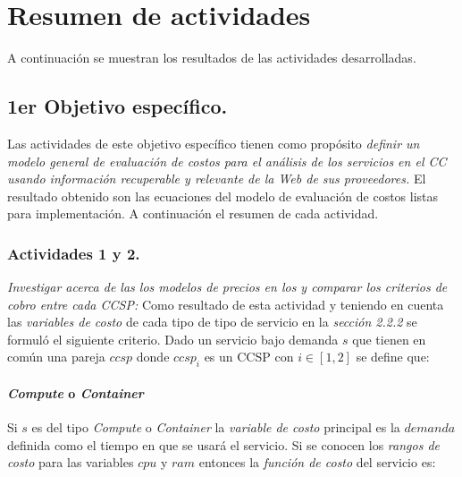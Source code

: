 
\chapter{Resumen de actividades} %

\label{ch:metodologia} %

A continuación se muestran los resultados de las actividades desarrolladas.

\section{1er Objetivo específico.}
Las actividades de este objetivo específico tienen como propósito \emph{definir un modelo general de evaluación de costos para el análisis de los servicios en el \acrshort{CC} usando información recuperable y relevante de la Web de sus proveedores.} El resultado obtenido son las ecuaciones del modelo de evaluación de costos listas para implementación. A continuación el resumen de cada actividad.

\subsection{Actividades 1 y 2.}
\emph{Investigar acerca de las los modelos de precios en los  y comparar los criterios de cobro entre cada \acrshort{CCSP}:}
\newline
\newline
Como resultado de esta actividad y teniendo en cuenta las \emph{variables de costo} de cada tipo de tipo de servicio en la \emph{sección 2.2.2} se formuló el siguiente criterio.
\newline
\newline
Dado un servicio bajo demanda \(s\) que tienen en común una pareja $ccsp$ donde $ccsp_i$ es un \acrshort{CCSP} con $i \in [1,2]$ se define que:

\subsubsection{\emph{Compute} o \emph{Container}}
Si $s$ es del tipo \emph{Compute} o \emph{Container} la \emph{variable de costo} principal es la $demanda$ definida como el tiempo en que se usará el servicio. Si se conocen los \emph{rangos de costo} para las variables $cpu$ y $ram$ entonces la \emph{función de costo} del servicio es:

